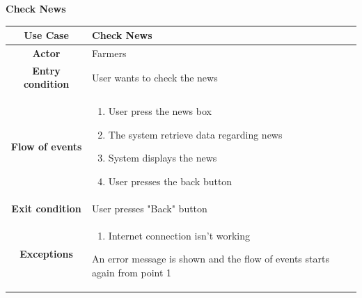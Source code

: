 \documentclass[table, 12pt]{article}
\begin{document}
\begin{itemize}
            \begin{table}[H]
                \item[] \textbf{Check News}
                \item[] 
                \centering
                \begin{tabular}{|c |m{}|}
                    \hline
                    \textbf{Use Case} & Check News\\ \hline
                    \textbf{Actor} & Farmers\\ \hline
                    \textbf{Entry condition} & User wants to check the news\\  \hline
                    \textbf{Flow of events} & \begin{enumerate}
                                                \item User press the news box
                                                \item The system retrieve data regarding news 
                                                \item System displays the news
                                                \item User presses the back button
                                            \end{enumerate}\\ \hline
                    \textbf{Exit condition} & User presses "Back" button\\ \hline
                    \textbf{Exceptions} &  \begin{enumerate}
                        \item Internet connection isn't working
                    \end{enumerate}
                    An error message is shown and the flow of events starts again from point 1\\ \hline                    
                \end{tabular}
            \end{table}


\end{itemize}
\end{document}
